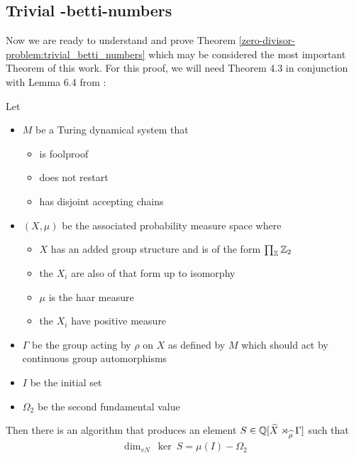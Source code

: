 \subsection{Trivial \ltwo-betti-numbers}
\label{the_zero_divisor_problem:main_theorem}

Now we are ready to understand and prove Theorem \ref{zero-divisor-problem:trivial_betti_numbers} which may be considered the most important Theorem of this work.
For this proof, we will need Theorem 4.3 in conjunction with Lemma 6.4 from \cite{gra14}:

\begin{Theorem}
	\label{the_zero_divisor_problem:grabowskis_theorem}
	Let
	\begin{itemize}
		\item{
			$M$ be a Turing dynamical system that
			\begin{itemize}
				\item is foolproof
				\item does not restart
				\item has disjoint accepting chains
			\end{itemize}
		}
		\item{
			$(X, \mu)$ be the associated probability measure space where
			\begin{itemize}
				\item $X$ has an added group structure and is of the form $\prod_{\mathbb{Z}} \mathbb{Z}_2$
				\item the $X_i$ are also of that form up to isomorphy
				\item $\mu$ is the haar measure
				\item the $X_i$ have positive measure
			\end{itemize}
		}
		\item $\Gamma$ be the group acting by $\rho$ on $X$ as defined by $M$ which should act by continuous group automorphisms\footnotemark
		\item $I$ be the initial set
		\item $\Omega_2$ be the second fundamental value
	\end{itemize}

	Then there is an algorithm that produces an element $S \in \mathbb{Q}[\widehat{X} \rtimes_{\widehat{\rho}} \Gamma]$ such that
	\begin{align*}
		\dim_{vN} ~ \ker ~ S = \mu(I) - \Omega_2
	\end{align*}
\end{Theorem}


